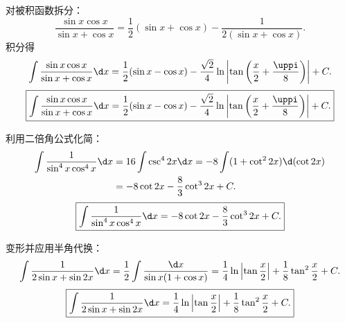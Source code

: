 \begin{solution}

    对被积函数拆分：
    \begin{equation}
        \frac{\sin x \cos x}{\sin x + \cos x} = \frac{1}{2}(\sin x + \cos x) - \frac{1}{2(\sin x + \cos x)}.
    \end{equation}
    积分得
    \begin{equation}
        \int \frac{\sin x \cos x}{\sin x + \cos x} \d x = \frac{1}{2}(\sin x - \cos x) - \frac{\sqrt{2}}{4}\ln\left| \tan\left( \frac{x}{2} + \frac{\uppi}{8} \right) \right| + C.
    \end{equation}
    \begin{equation}
        \boxed{\int \frac{\sin x \cos x}{\sin x + \cos x} \d x = \frac{1}{2}(\sin x - \cos x) - \frac{\sqrt{2}}{4}\ln\left| \tan\left( \frac{x}{2} + \frac{\uppi}{8} \right) \right| + C.}
    \end{equation}


    利用二倍角公式化简：
    \begin{equation}
        \begin{aligned}
            \int \frac{1}{\sin^4 x \cos^4 x} \d x & = 16\int \csc^4 2x \d x = -8\int (1 + \cot^2 2x) \d(\cot 2x) \\
                                                  & = -8\cot 2x - \frac{8}{3}\cot^3 2x + C.
        \end{aligned}
    \end{equation}
    \begin{equation}
        \boxed{\int \frac{1}{\sin^4 x \cos^4 x} \d x = -8\cot 2x - \frac{8}{3}\cot^3 2x + C.}
    \end{equation}


    变形并应用半角代换：
    \begin{equation}
        \int \frac{1}{2\sin x + \sin 2x} \d x = \frac{1}{2}\int \frac{\d x}{\sin x(1 + \cos x)} = \frac{1}{4}\ln\left|\tan\frac{x}{2}\right| + \frac{1}{8}\tan^2\frac{x}{2} + C.
    \end{equation}
    \begin{equation}
        \boxed{\int \frac{1}{2\sin x + \sin 2x} \d x = \frac{1}{4}\ln\left|\tan\frac{x}{2}\right| + \frac{1}{8}\tan^2\frac{x}{2} + C.}
    \end{equation}



\end{solution}
